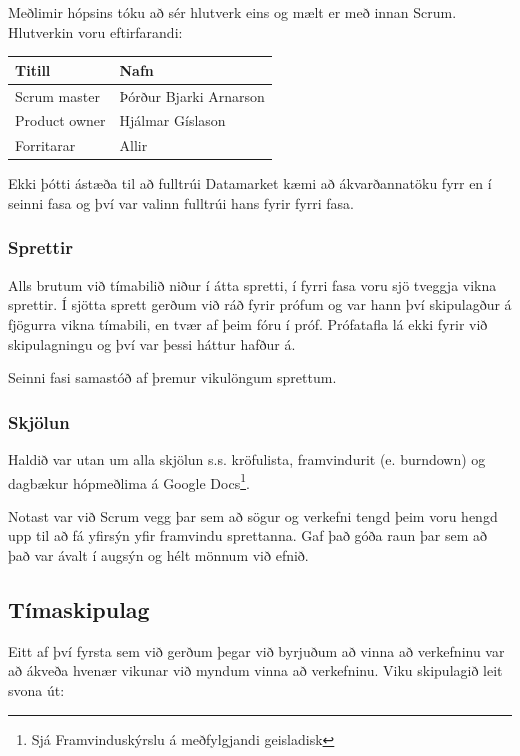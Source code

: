 \documentclass{article}
\begin{document}
Meðlimir hópsins tóku að sér hlutverk eins og mælt er með innan Scrum. Hlutverkin voru eftirfarandi:

\vspace{5 mm}
\begin{tabular}{| l | l |}
\hline
Titill & Nafn \\
\hline \hline
Scrum master & Þórður Bjarki Arnarson\\
\hline
Product owner & Hjálmar Gíslason \\
\hline
Forritarar & Allir \\
\hline
\end{tabular}
\vspace{5 mm}

Ekki þótti ástæða til að fulltrúi 
Datamarket kæmi að ákvarðannatöku fyrr en í seinni fasa og því var 
valinn fulltrúi hans fyrir fyrri fasa.

\subsubsection{Sprettir}

Alls brutum við tímabilið niður í átta spretti, í fyrri fasa voru sjö 
tveggja vikna sprettir. Í sjötta sprett gerðum við ráð fyrir prófum og var hann því
skipulagður á fjögurra vikna tímabili, 
en tvær af þeim fóru í próf. Prófatafla lá ekki fyrir við skipulagningu og því 
var þessi háttur hafður á. 

Seinni fasi samastóð af þremur vikulöngum sprettum.

\subsubsection{Skjölun}

Haldið var utan um alla skjölun s.s. kröfulista, framvindurit (e. burndown) og dagbækur hópmeðlima á
Google Docs\footnote{Sjá Framvinduskýrslu á meðfylgjandi geisladisk}. 

Notast var við Scrum vegg þar sem að sögur og verkefni tengd þeim voru hengd upp til að fá yfirsýn 
yfir framvindu sprettanna. Gaf það góða raun þar sem að það var ávalt í augsýn og hélt mönnum við efnið.

\subsection{Tímaskipulag}

Eitt af því fyrsta sem við gerðum þegar við byrjuðum að vinna að verkefninu var
að ákveða hvenær vikunar við myndum vinna að verkefninu.
Viku skipulagið leit svona út:
\end{document}
